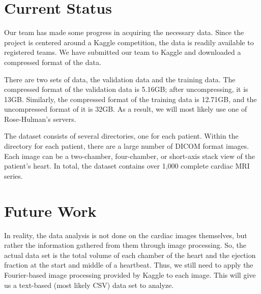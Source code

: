 \documentclass{memo}
\begin{document}
	
\maketitle

\section{Current Status}
Our team has made some progress in acquiring the necessary data. Since the project is centered around a Kaggle competition, the data is readily available to registered teams. We have submitted our team to Kaggle and downloaded a compressed format of the data.

There are two sets of data, the validation data and the training data. The compressed format of the validation data is 5.16GB; after uncompressing, it is 13GB. Similarly, the compressed format of the training data is 12.71GB, and the uncompressed format of it is 32GB. As a result, we will most likely use one of Rose-Hulman's servers. 

The dataset consists of several directories, one for each patient. Within the directory for each patient, there are a large number of DICOM format images. Each image can be a two-chamber, four-chamber, or short-axis stack view of the patient's heart. In total, the dataset contains over 1,000 complete cardiac MRI series.

\section{Future Work}
In reality, the data analysis is not done on the cardiac images themselves, but rather the information gathered from them through image processing. So, the actual data set is the total volume of each chamber of the heart and the ejection fraction at the start and middle of a heartbeat. Thus, we still need to apply the Fourier-based image processing provided by Kaggle to each image. This will give us a text-based (most likely CSV) data set to analyze.
\end{document}
